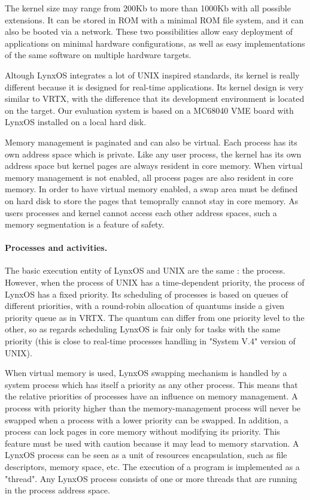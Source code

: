 \documentclass[10pt]{report}
\begin{document}
The kernel size may range from 200Kb to more than 1000Kb with all 
possible extensions. It can be stored in ROM with a minimal ROM 
file system, and it can also be booted via a network. These two 
possibilities allow easy deployment of applications on minimal 
hardware configurations, as well as easy implementations of the 
same software on multiple hardware targets.

Altough LynxOS integrates a lot of UNIX inspired standards, its 
kernel is really different because it is designed for real-time 
applications. Its kernel design is very similar to VRTX, with the 
difference that its development environment is located on the 
target. Our evaluation system is based on a MC68040 VME board 
with LynxOS installed on a local hard disk.

Memory management is paginated and can also be virtual. Each 
process has its own address space which is private. Like any user 
process, the kernel has its own address space but kernel pages 
are always resident in core memory. When virtual memory 
management is not enabled, all process pages are also resident in 
core memory. In order to have virtual memory enabled, a swap area 
must be defined on hard disk to store the pages that temoprally 
cannot stay in core memory. As users processes and kernel cannot 
access each other address spaces, such a memory segmentation is a 
feature of safety.


\paragraph{Processes and activities.} The basic execution entity of LynxOS and UNIX are the same : the process. However, when 
the process of UNIX has a time-dependent priority, the process of LynxOS has a fixed priority. Its scheduling of processes is 
based on queues of different priorities, with a round-robin allocation of quantums inside a given priority queue as in VRTX. 
The quantum can differ from one priority level to the other, so as regards scheduling LynxOS is fair only for tasks with the same 
priority (this is close to real-time processes handling in "System V.4" version of UNIX).

When virtual memory is used, LynxOS swapping mechanism is handled by a system process which has itself a priority
as any other process. This means that the relative priorities of processes have an influence on memory management. A process with 
priority higher than the memory-management process will never be swapped when a process with a lower priority can be swapped. 
In addition, a process can lock pages in core memory without modifying its priority. This feature must be used with
caution because it may lead to memory starvation. A LynxOS process can be seen as a unit of resources encapsulation, such
as file descriptors, memory space, etc. The execution of a program is implemented as a "thread". Any LynxOS process consists of 
one or more threads that are running in the process address space.
\end{document}
